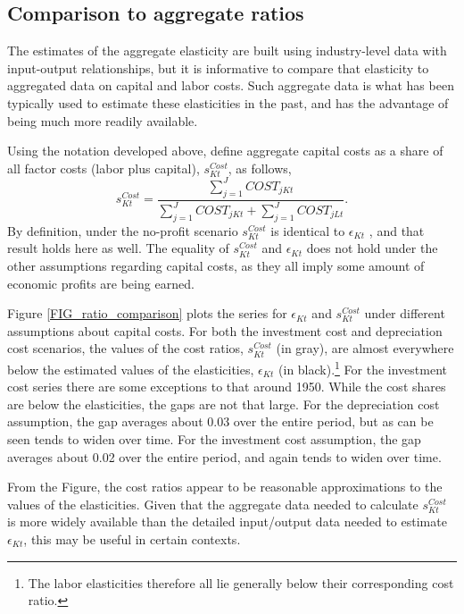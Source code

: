 \documentclass[11pt]{article}
\begin{document}
\subsection{Comparison to aggregate ratios}\label{SEC_ratios}
The estimates of the aggregate elasticity are built using industry-level data with input-output relationships, but it is informative to compare that elasticity to aggregated data on capital and labor costs. Such aggregate data is what has been typically used to estimate these elasticities in the past, and has the advantage of being much more readily available.

Using the notation developed above, define aggregate capital costs as a share of all factor costs (labor plus capital), $s^{Cost}_{Kt}$, as follows,
\begin{equation}
	s^{Cost}_{Kt} = \frac{\sum_{j=1}^{J} COST_{jKt}}{\sum_{j=1}^{J} COST_{jKt} + \sum_{j=1}^{J} COST_{jLt}}. \label{EQ_scost}
\end{equation}
By definition, under the no-profit scenario $s^{Cost}_{Kt}$ is identical to $\epsilon_{Kt}$ \citep{bfshortnote,bfprodge}, and that result holds here as well. The equality of $s^{Cost}_{Kt}$ and $\epsilon_{Kt}$ does not hold under the other assumptions regarding capital costs, as they all imply some amount of economic profits are being earned. 

Figure \ref{FIG_ratio_comparison} plots the series for $\epsilon_{Kt}$ and $s^{Cost}_{Kt}$ under different assumptions about capital costs. For both the investment cost and depreciation cost scenarios, the values of the cost ratios, $s^{Cost}_{Kt}$ (in gray), are almost everywhere below the estimated values of the elasticities, $\epsilon_{Kt}$ (in black).\footnote{The labor elasticities therefore all lie generally below their corresponding cost ratio.} For the investment cost series there are some exceptions to that around 1950. While the cost shares are below the elasticities, the gaps are not that large. For the depreciation cost assumption, the gap averages about 0.03 over the entire period, but as can be seen tends to widen over time. For the investment cost assumption, the gap averages about 0.02 over the entire period, and again tends to widen over time.

From the Figure, the cost ratios appear to be reasonable approximations to the values of the elasticities. Given that the aggregate data needed to calculate $s^{Cost}_{Kt}$ is more widely available than the detailed input/output data needed to estimate $\epsilon_{Kt}$, this may be useful in certain contexts. 
\end{document}
